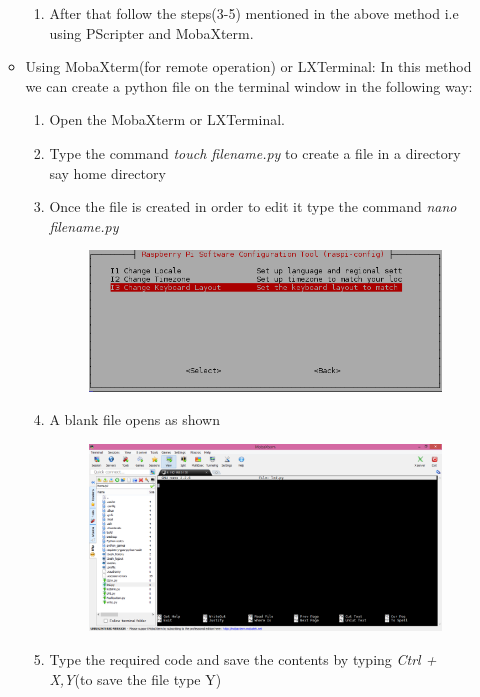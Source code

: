 \documentclass[11pt,a4paper]{report}
\begin{document}
\begin{flushleft}
\begin{enumerate}
\begin{itemize}
\begin{enumerate}
				\item After that follow the steps(3-5) mentioned in the above method i.e using PScripter and MobaXterm.
			\end{enumerate}
			\item Using MobaXterm(for remote operation) or LXTerminal:
			In this method we can create a python file on the terminal window in the following way:
			\begin{enumerate}
				\item Open the MobaXterm or LXTerminal.
				\item Type the command \textit{touch filename.py} to create a file in a directory say home directory
				\item Once the file is created in order to edit it type the command \textit{nano filename.py}
				\newpage
				\begin{figure}[h!]
					\includegraphics[scale=0.4]{4.png}
					\centering
					\caption{}
				\end{figure}
				\item A blank file opens as shown 
				\begin{figure}[h!]
					\includegraphics[scale=0.4]{5.png}
					\centering
					\caption{}
				\end{figure}
				\item Type the required code and save the contents by typing \textit{Ctrl + X,Y}(to save the file type Y)

\end{enumerate}
\end{itemize}
\end{enumerate}
\end{flushleft}
\end{document}
